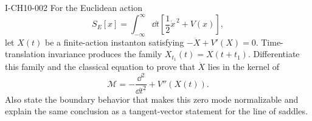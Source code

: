 \begin{exercise}{I-CH10-002}
For the Euclidean action
\[
  S_E[x]=\int_{-\infty}^{\infty}\dd t
  \left[\frac12\dot x^{\,2}+V(x)\right],
\]
let $X(t)$ be a finite-action instanton satisfying
$-\ddot X+V'(X)=0$.  Time-translation invariance produces the family
$X_{t_1}(t)=X(t+t_1)$.  Differentiate this family and the classical equation
to prove that $\dot X$ lies in the kernel of
\[
  \mathcal M=-\frac{\dd^2}{\dd t^2}+V''(X(t)).
\]
Also state the boundary behavior that makes this zero mode normalizable and
explain the same conclusion as a tangent-vector statement for the line of
saddles.
\end{exercise}
